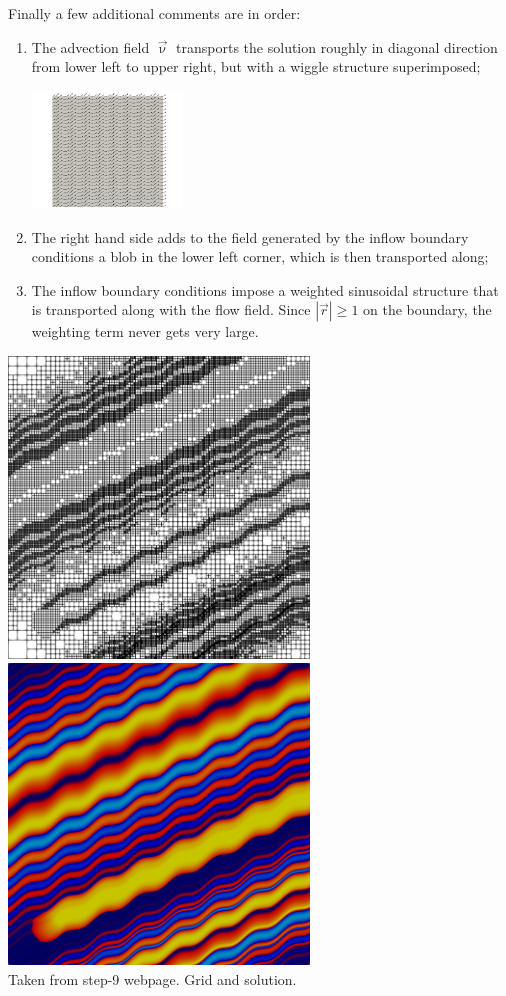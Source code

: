 Finally a few additional comments are in order:
\begin{enumerate}
\item The advection field $\vec{\upnu}$ transports the solution roughly in diagonal direction 
from lower left to upper right, but with a wiggle structure superimposed; 
\begin{center}
\includegraphics[width=4cm]{python_codes/fieldstone_43/images/vel}
\end{center}

\item The right hand side adds to the field generated by the inflow boundary conditions a blob 
in the lower left corner, which is then transported along; 
\item The inflow boundary conditions impose a weighted sinusoidal structure that is transported along 
with the flow field. Since $|\vec{r}|\ge 1$ on the boundary, the weighting term never gets very large.
\end{enumerate}

\begin{center}
\includegraphics[width=8cm]{python_codes/fieldstone_43/images/step-9-grid-9.png}
\includegraphics[width=8cm]{python_codes/fieldstone_43/images/step-9-solution-9.png}\\
{\captionfont Taken from step-9 webpage. Grid and solution.}
\end{center}

